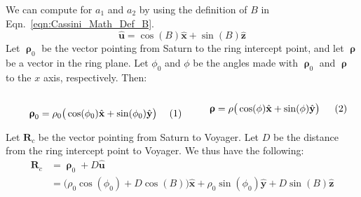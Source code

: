             We can compute for $a_{1}$ and $a_{2}$ by using
            the definition of $B$ in
            Eqn.~\ref{eqn:Cassini_Math_Def_B}.
            \begin{equation}
                \hat{\mathbf{u}}
                =\cos(B)\hat{\mathbf{x}}+
                \sin(B)\hat{\mathbf{z}}
            \end{equation}
            Let $\boldsymbol{\uprho}_{0}$ be the vector pointing
            from Saturn to the ring intercept point,
            and let $\boldsymbol{\uprho}$ be a vector in
            the ring plane. Let $\phi_{0}$ and
            $\phi$ be the angles made with
            $\boldsymbol{\uprho}_{0}$ and $\boldsymbol{\uprho}$
            to the $x$ axis, respectively. Then:
            \par
            \vspace{-1ex}
            \begin{subequations}
                \begin{minipage}{0.49\textwidth}
                    \begin{equation}
                        \boldsymbol{\uprho}_{0}
                        =\rho_{0}\big(\cos(\phi_0)
                        \hat{\mathbf{x}}+
                        \sin(\phi_{0})\hat{\mathbf{y}}\big)
                    \end{equation}
                \end{minipage}
                \hfill
                \begin{minipage}{0.49\textwidth}
                    \begin{equation}
                        \boldsymbol{\uprho}
                        =\rho\big(\cos(\phi)
                        \hat{\mathbf{x}}+
                        \sin(\phi)\hat{\mathbf{y}}\big)
                    \end{equation}
                \end{minipage}
            \end{subequations}
            \par\hfill\par\hfill\par
            \vspace{-1.5ex}
            Let $\mathbf{R}_{c}$ be the vector pointing
            from Saturn to Voyager. Let $D$ be the
            distance from the ring intercept point
            to Voyager.
            We thus have the following:
            \begin{subequations}
                \begin{align}
                    \mathbf{R}_{c}&=
                    \boldsymbol{\uprho}_{0}+
                    D\hat{\mathbf{u}}\\
                    &=\big(
                    \rho_{0}\cos(\phi_0)+D\cos(B)
                    \big)\hat{\mathbf{x}}+
                    \rho_{0}\sin(\phi_{0})\hat{\mathbf{y}}+
                    D\sin(B)\hat{\mathbf{z}}
                \end{align}
            \end{subequations}
